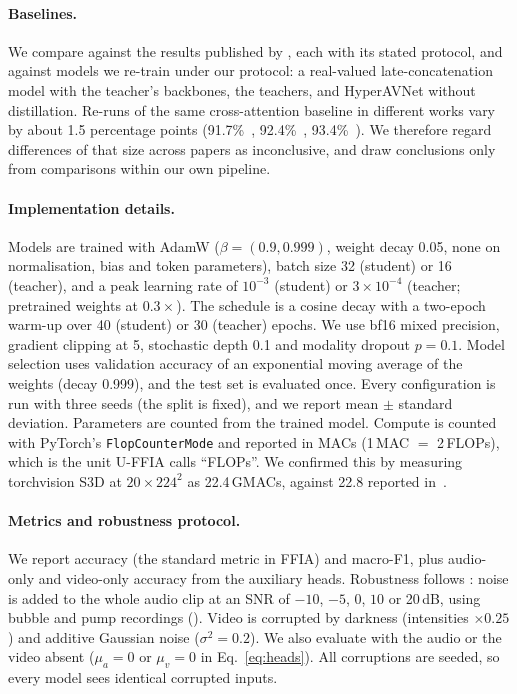 \paragraph{Baselines.} We compare against the results published by
\cite{cui2024uffia,acafnet2025,dynagate2026,hmmfnet2026,hmkd2026,ldmf2026}, each with its stated protocol,
and against models we re-train under our protocol: a real-valued late-concatenation model with the
teacher's backbones, the teachers, and HyperAVNet without distillation. Re-runs of the same
cross-attention baseline in different works vary by about 1.5 percentage points (91.7\%~\cite{cui2024uffia},
92.4\%~\cite{dynagate2026}, 93.4\%~\cite{acafnet2025}). We therefore regard differences of that size
across papers as inconclusive, and draw conclusions only from comparisons within our own pipeline.

\paragraph{Implementation details.} Models are trained with AdamW ($\beta=(0.9,0.999)$, weight decay
0.05, none on normalisation, bias and token parameters), batch size 32 (student) or 16 (teacher), and a
peak learning rate of $10^{-3}$ (student) or $3\times10^{-4}$ (teacher; pretrained weights at
$0.3\times$). The schedule is a cosine decay with a two-epoch warm-up over 40 (student) or 30
(teacher) epochs. We use bf16 mixed precision, gradient clipping at 5, stochastic depth 0.1 and modality
dropout $p=0.1$. Model selection uses validation accuracy of an exponential moving average of the
weights (decay 0.999), and the test set is evaluated once. Every configuration is run with three
seeds (the split is fixed), and we report mean $\pm$ standard deviation. Parameters are counted from
the trained model. Compute is counted with PyTorch's \texttt{FlopCounterMode} and reported in MACs
(1\,MAC $=$ 2\,FLOPs), which is the unit U-FFIA calls ``FLOPs''. We confirmed this by measuring
torchvision S3D at $20\times224^{2}$ as 22.4\,GMACs, against 22.8 reported in~\cite{cui2024uffia}.

\paragraph{Metrics and robustness protocol.} We report accuracy (the standard metric in FFIA) and
macro-F1, plus audio-only and video-only accuracy from the auxiliary heads. Robustness follows
\cite{cui2024uffia}: noise is added to the whole audio clip at an SNR of $-10$, $-5$, $0$, $10$ or 20\,dB,
using bubble and pump recordings (). Video is corrupted by darkness (intensities $\times0.25$) and additive Gaussian noise
($\sigma^{2}=0.2$). We also evaluate with the audio or the video absent ($\mu_a=0$ or $\mu_v=0$ in
Eq.~\eqref{eq:heads}). All corruptions are seeded, so every model sees identical corrupted inputs.

